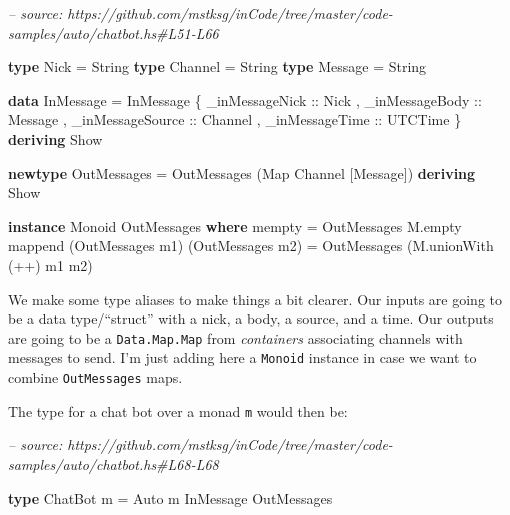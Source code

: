 \documentclass[]{article}
\newenvironment{Shaded}{}{}
\newcommand{\CommentTok}[1]{\textcolor[rgb]{0.38,0.63,0.69}{\textit{#1}}}
\newcommand{\DataTypeTok}[1]{\textcolor[rgb]{0.56,0.13,0.00}{#1}}
\newcommand{\FunctionTok}[1]{\textcolor[rgb]{0.02,0.16,0.49}{#1}}
\newcommand{\KeywordTok}[1]{\textcolor[rgb]{0.00,0.44,0.13}{\textbf{#1}}}
\newcommand{\NormalTok}[1]{#1}
\newcommand{\OtherTok}[1]{\textcolor[rgb]{0.00,0.44,0.13}{#1}}
\begin{document}
\begin{Shaded}
\begin{Highlighting}[]
\CommentTok{-- source: https://github.com/mstksg/inCode/tree/master/code-samples/auto/chatbot.hs#L51-L66}

\KeywordTok{type} \DataTypeTok{Nick}    \FunctionTok{=} \DataTypeTok{String}
\KeywordTok{type} \DataTypeTok{Channel} \FunctionTok{=} \DataTypeTok{String}
\KeywordTok{type} \DataTypeTok{Message} \FunctionTok{=} \DataTypeTok{String}

\KeywordTok{data} \DataTypeTok{InMessage} \FunctionTok{=} \DataTypeTok{InMessage}\NormalTok{ \{}\OtherTok{ _inMessageNick   ::} \DataTypeTok{Nick}
\NormalTok{                           ,}\OtherTok{ _inMessageBody   ::} \DataTypeTok{Message}
\NormalTok{                           ,}\OtherTok{ _inMessageSource ::} \DataTypeTok{Channel}
\NormalTok{                           ,}\OtherTok{ _inMessageTime   ::} \DataTypeTok{UTCTime}
\NormalTok{                           \} }\KeywordTok{deriving} \DataTypeTok{Show}

\KeywordTok{newtype} \DataTypeTok{OutMessages} \FunctionTok{=} \DataTypeTok{OutMessages}\NormalTok{ (}\DataTypeTok{Map} \DataTypeTok{Channel}\NormalTok{ [}\DataTypeTok{Message}\NormalTok{]) }\KeywordTok{deriving} \DataTypeTok{Show}

\KeywordTok{instance} \DataTypeTok{Monoid} \DataTypeTok{OutMessages} \KeywordTok{where}
\NormalTok{    mempty  }\FunctionTok{=} \DataTypeTok{OutMessages}\NormalTok{ M.empty}
\NormalTok{    mappend (}\DataTypeTok{OutMessages}\NormalTok{ m1) (}\DataTypeTok{OutMessages}\NormalTok{ m2)}
            \FunctionTok{=} \DataTypeTok{OutMessages}\NormalTok{ (M.unionWith (}\FunctionTok{++}\NormalTok{) m1 m2)}
\end{Highlighting}
\end{Shaded}

We make some type aliases to make things a bit clearer. Our inputs are going to
be a data type/``struct'' with a nick, a body, a source, and a time. Our outputs
are going to be a \texttt{Data.Map.Map} from \emph{containers} associating
channels with messages to send. I'm just adding here a \texttt{Monoid} instance
in case we want to combine \texttt{OutMessages} maps.

The type for a chat bot over a monad \texttt{m} would then be:

\begin{Shaded}
\begin{Highlighting}[]
\CommentTok{-- source: https://github.com/mstksg/inCode/tree/master/code-samples/auto/chatbot.hs#L68-L68}

\KeywordTok{type} \DataTypeTok{ChatBot}\NormalTok{ m }\FunctionTok{=} \DataTypeTok{Auto}\NormalTok{ m }\DataTypeTok{InMessage} \DataTypeTok{OutMessages}
\end{Highlighting}
\end{Shaded}
\end{document}
